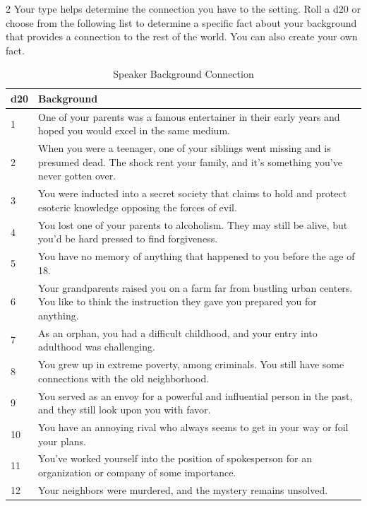 \begin{multicols}{2}
Your type helps determine the connection you have to the setting. Roll a d20 or choose from the following list to determine a specific fact about your background that provides a connection to the rest of the world. You can also create your own fact.

\begin{table}
\centering

\caption{Speaker Background Connection}
\label{tab:Speaker Background Connection}

\begin{tabularx}{\textwidth}{| p{} | p{} |}
\hline
\textbf{d20} & \textbf{Background} \\
\hline
1 & One of your parents was a famous entertainer in their early years and hoped you would excel in the same medium. \\ \hline
2 & When you were a teenager, one of your siblings went missing and is presumed dead. The shock rent your family, and it’s something you’ve never gotten over. \\ \hline
3 & You were inducted into a secret society that claims to hold and protect esoteric knowledge opposing the forces of evil.  \\ \hline
4 & You lost one of your parents to alcoholism. They may still be alive, but you’d be hard pressed to find forgiveness.  \\ \hline
5 & You have no memory of anything that happened to you before the age of 18. \\ \hline
6 & Your grandparents raised you on a farm far from bustling urban centers. You like to think the instruction they gave you prepared you for anything. \\ \hline
7 & As an orphan, you had a difficult childhood, and your entry into adulthood was challenging. \\ \hline
8 & You grew up in extreme poverty, among criminals. You still have some connections with the old neighborhood.  \\ \hline
9 & You served as an envoy for a powerful and influential person in the past, and they still look upon you with favor.  \\ \hline
10 & You have an annoying rival who always seems to get in your way or foil your plans. \\ \hline
11 & You’ve worked yourself into the position of spokesperson for an organization or company of some importance.\\ \hline
12 & Your neighbors were murdered, and the mystery remains unsolved. \\ \hline

\end{tabularx}
\end{table}
\end{multicols}
